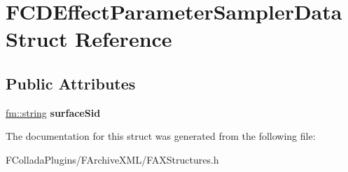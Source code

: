 \hypertarget{structFCDEffectParameterSamplerData}{
\section{FCDEffectParameterSamplerData Struct Reference}
\label{structFCDEffectParameterSamplerData}
}
\subsection*{Public Attributes}
\begin{DoxyCompactItemize}
\item 
\hypertarget{structFCDEffectParameterSamplerData_af5427cfd6205ecb0a6a54c04fb6bf6c3}{
\hyperlink{classfm_1_1stringT}{fm::string} {\bfseries surfaceSid}}
\label{structFCDEffectParameterSamplerData_af5427cfd6205ecb0a6a54c04fb6bf6c3}

\end{DoxyCompactItemize}


The documentation for this struct was generated from the following file:\begin{DoxyCompactItemize}
\item 
FColladaPlugins/FArchiveXML/FAXStructures.h\end{DoxyCompactItemize}
